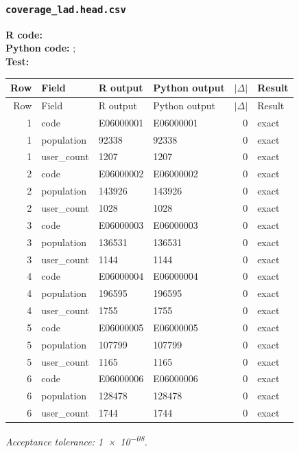 \documentclass[10pt]{article}
\begin{document}
\subsubsection{\texorpdfstring{\texttt{coverage\_lad.head.csv}}{coverage\_lad.head.csv}}
{\footnotesize \textbf{R code:} \\ \textbf{Python code:} ; \\ \textbf{Test:} \par}

\small
\begin{longtable}{@{}r p{}p{}p{}rl@{}}
\toprule
Row & Field & R output & Python output & $|\Delta|$ & Result \\
\midrule
\endfirsthead
\toprule
Row & Field & R output & Python output & $|\Delta|$ & Result \\
\midrule
\endhead
1 & code & E06000001 & E06000001 & 0 & exact \\
1 & population & 92338 & 92338 & 0 & exact \\
1 & user\_\allowbreak{}count & 1207 & 1207 & 0 & exact \\
2 & code & E06000002 & E06000002 & 0 & exact \\
2 & population & 143926 & 143926 & 0 & exact \\
2 & user\_\allowbreak{}count & 1028 & 1028 & 0 & exact \\
3 & code & E06000003 & E06000003 & 0 & exact \\
3 & population & 136531 & 136531 & 0 & exact \\
3 & user\_\allowbreak{}count & 1144 & 1144 & 0 & exact \\
4 & code & E06000004 & E06000004 & 0 & exact \\
4 & population & 196595 & 196595 & 0 & exact \\
4 & user\_\allowbreak{}count & 1755 & 1755 & 0 & exact \\
5 & code & E06000005 & E06000005 & 0 & exact \\
5 & population & 107799 & 107799 & 0 & exact \\
5 & user\_\allowbreak{}count & 1165 & 1165 & 0 & exact \\
6 & code & E06000006 & E06000006 & 0 & exact \\
6 & population & 128478 & 128478 & 0 & exact \\
6 & user\_\allowbreak{}count & 1744 & 1744 & 0 & exact \\
\bottomrule
\end{longtable}
\normalsize
\textit{Acceptance tolerance: \num{1e-08}.}
\end{document}
